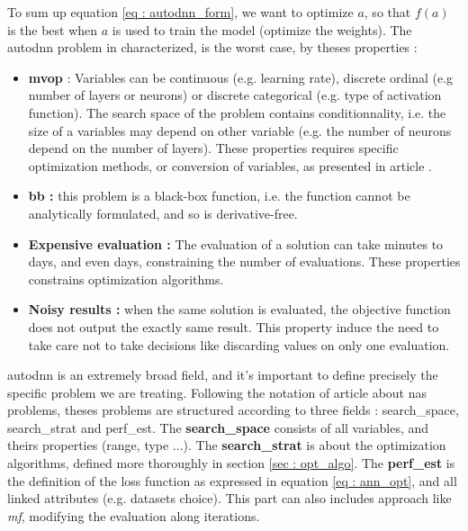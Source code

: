 To sum up equation \ref{eq : autodnn_form}, we want to optimize $a$, so that $f(a)$ is the best when $a$ is used to train the model (optimize the weights). The \acrshort{autodnn} problem in characterized, is the worst case, by theses properties : 
\begin{itemize}
    \item \textbf{\acrfull{mvop}} : Variables can be continuous (e.g. learning rate), discrete ordinal (e.g number of layers or neurons) or discrete categorical (e.g. type of activation function). The search space of the problem contains conditionnality, i.e. the size of a variables may depend on other variable (e.g. the number of neurons depend on the number of layers). These properties requires specific optimization methods, or conversion of variables, as presented in article \cite{talbi_metaheuristics_2024}.
    \item \textbf{\Gls{bb} :} this problem is a black-box function, i.e. the function cannot be analytically formulated, and so is derivative-free.
    \item \textbf{Expensive evaluation :} The evaluation of a solution can take minutes to days, and even days, constraining the number of evaluations. These properties constrains optimization algorithms. 
    \item \textbf{ Noisy results : } when the same solution is evaluated, the objective function does not output the exactly same result. This property induce the need to take care not to take decisions like discarding values on only one evaluation. 
\end{itemize}

\acrshort{autodnn} is an extremely broad field, and it's important to define precisely the specific problem we are treating. Following the notation of article \cite{elsken_neural_2019} about \acrshort{nas} problems, theses problems are structured according to three fields : \Gls{search_space}, \Gls{search_strat} and \Gls{perf_est}. The \textbf{\gls{search_space}} consists of all variables, and theirs properties (range, type ...). The \textbf{\gls{search_strat}} is about the optimization algorithms, defined more thoroughly in section \ref{sec : opt_algo}. The \textbf{\gls{perf_est}} is the definition of the loss function as expressed in equation \ref{eq : ann_opt}, and all linked attributes (e.g. datasets choice). This part can also includes approach like \textit{\gls{mf}}, modifying the evaluation along iterations.



